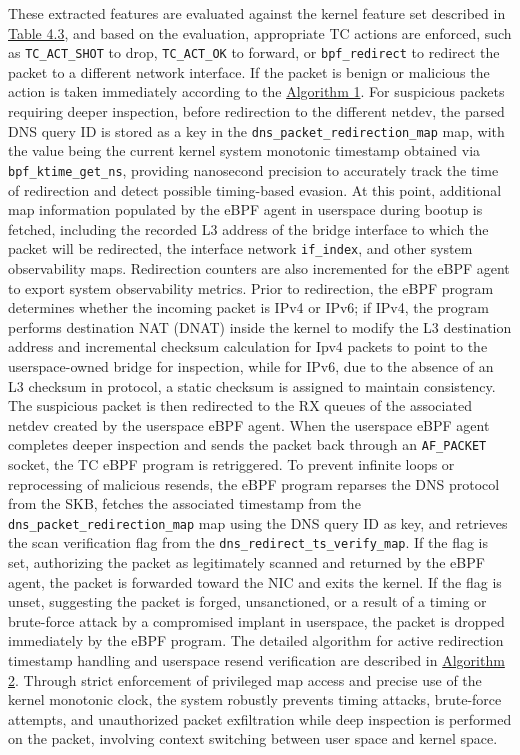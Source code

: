 \documentclass [11pt, proquest] {uwthesis}[2020/02/24]
\begin{document}
These extracted features are evaluated against the kernel feature set described in \hyperref[sec:feature-kernel]{Table 4.3}, and based on the evaluation, appropriate TC actions are enforced, such as \texttt{TC\_ACT\_SHOT} to drop, \texttt{TC\_ACT\_OK} to forward, or \texttt{bpf\_redirect} to redirect the packet to a different network interface. If the packet is benign or malicious the action is taken immediately according to the \hyperref[sec:alg1]{Algorithm 1}. For suspicious packets requiring deeper inspection, before redirection to the different netdev, the parsed DNS query ID is stored as a key in the \texttt{dns\_packet\_redirection\_map} map, with the value being the current kernel system monotonic timestamp obtained via \texttt{bpf\_ktime\_get\_ns}, providing nanosecond precision to accurately track the time of redirection and detect possible timing-based evasion. At this point, additional map information populated by the eBPF agent in userspace during bootup is fetched, including the recorded L3 address of the bridge interface to which the packet will be redirected, the interface network \texttt{if\_index}, and other system observability maps. Redirection counters are also incremented for the eBPF agent to export system observability metrics. Prior to redirection, the eBPF program determines whether the incoming packet is IPv4 or IPv6; if IPv4, the program performs destination NAT (DNAT) inside the kernel to modify the L3 destination address and incremental checksum calculation for Ipv4 packets to point to the userspace-owned bridge for inspection, while for IPv6, due to the absence of an L3 checksum in protocol, a static checksum is assigned to maintain consistency. The suspicious packet is then redirected to the RX queues of the associated netdev created by the userspace eBPF agent. When the userspace eBPF agent completes deeper inspection and sends the packet back through an \texttt{AF\_PACKET} socket, the TC eBPF program is retriggered. To prevent infinite loops or reprocessing of malicious resends, the eBPF program reparses the DNS protocol from the SKB, fetches the associated timestamp from the \texttt{dns\_packet\_redirection\_map} map using the DNS query ID as key, and retrieves the scan verification flag from the \texttt{dns\_redirect\_ts\_verify\_map}. If the flag is set, authorizing the packet as legitimately scanned and returned by the eBPF agent, the packet is forwarded toward the NIC and exits the kernel. If the flag is unset, suggesting the packet is forged, unsanctioned, or a result of a timing or brute-force attack by a compromised implant in userspace, the packet is dropped immediately by the eBPF program. The detailed algorithm for active redirection timestamp handling and userspace resend verification are described in \hyperref[sec:alg2]{Algorithm 2}. Through strict enforcement of privileged map access and precise use of the kernel monotonic clock, the system robustly prevents timing attacks, brute-force attempts, and unauthorized packet exfiltration while deep inspection is performed on the packet, involving context switching between user space and kernel space.
\end{document}
